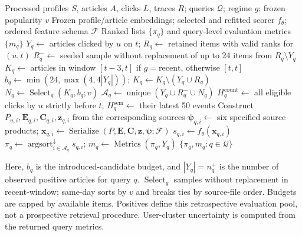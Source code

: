 \begin{algorithm*}[t]
\caption{Retrospective candidate construction and PEC ranking}
\label{alg:pec-ranking}
\small
\begin{algorithmic}[1]
\Require Processed profiles $S$, articles $A$, clicks $L$, traces $R$; queries $\mathcal Q$; regime $g$; frozen popularity $v$
\Require Frozen profile/article embeddings; selected and refitted scorer $f_\theta$; ordered feature schema $\mathcal F$
\Ensure Ranked lists $\{\pi_q\}$ and query-level evaluation metrics $\{m_q\}$
  \State $Y_q\gets$ articles clicked by $u$ on $t$; $R_q\gets$ retained items with valid ranks for $(u,t)$
  \State $R_q^-\gets$ seeded sample without replacement of up to 24 items from $R_q\setminus Y_q$ 
  \State $K_q\gets$ articles in window $[t-3,t]$ if $g=\mathrm{recent}$, otherwise $[t,t]$
  \State $b_q\gets\min(24,\max(4,4|Y_q|))$; $K_q\gets K_q\setminus(Y_q\cup R_q)$ 
  \State $N_q\gets\operatorname{Select}_g(K_q,b_q;v)$ 
  \State $\mathcal A_q\gets\operatorname{unique}(Y_q\cup R_q^-\cup N_q)$ 
  \State $H_q^{\mathrm{count}}\gets$ all eligible clicks by $u$ strictly before $t$; $H_q^{\mathrm{sem}}\gets$ their latest 50 events
    \State Construct $P_{u,i},\mathbf E_{q,i},\mathbf C_{q,i},\mathbf z_{q,i}$ from the corresponding sources
    \State $\boldsymbol\psi_{q,i}\gets$ six specified source products; $\mathbf x_{q,i}\gets\operatorname{Serialize}(P,\mathbf E,\mathbf C,\mathbf z,\boldsymbol\psi;\mathcal F)$
    \State $s_{q,i}\gets f_\theta(\mathbf x_{q,i})$
  \EndFor
  \State $\pi_q\gets\operatorname{argsort}^{\downarrow}_{i\in\mathcal A_q}s_{q,i}$; $m_q\gets\operatorname{Metrics}(\pi_q,Y_q)$
\EndFor
\State \Return $\{\pi_q,m_q:q\in\mathcal Q\}$
\end{algorithmic}
\vspace{2pt}
\footnotesize Here, $b_q$ is the introduced-candidate budget, and $|Y_q|=n_q^+$ is the number of observed positive articles for query $q$. $\operatorname{Select}_g$ samples without replacement in recent-window; same-day sorts by $v$ and breaks ties by source-file order. Budgets are capped by available items. Positives define this retrospective evaluation pool, not a prospective retrieval procedure. User-cluster uncertainty is computed from the returned query metrics.
\end{algorithm*}
